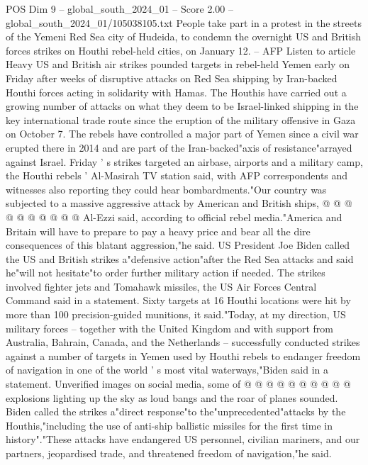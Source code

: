 \begin{textsample}{POS Dim 9 – global\_south\_2024\_01 – Score 2.00 – global\_south\_2024\_01/105038105.txt}  \label{ex:f9_pos_018}
People take part in a protest in the streets of the Yemeni Red Sea city of Hudeida, to condemn the overnight US and British forces strikes on Houthi rebel-held cities, on January 12. -- AFP Listen to article Heavy US and British air strikes pounded targets in rebel-held Yemen early on Friday after weeks of disruptive attacks on Red Sea shipping by Iran-backed Houthi forces acting in solidarity with Hamas.
The Houthis have carried out a growing number of attacks on what they deem to be Israel-linked shipping in the key international trade route since the eruption of the military offensive in Gaza on October 7.
The rebels have controlled a major part of Yemen since a civil war erupted there in 2014 and are part of the Iran-backed"axis of resistance"arrayed against Israel.
Friday ' s strikes targeted an airbase, airports and a military camp, the Houthi rebels ' Al-Masirah TV station said, with AFP correspondents and witnesses also reporting they could hear bombardments."Our country was subjected to a massive aggressive attack by American and British ships, @ @ @ @ @ @ @ @ @ @ Al-Ezzi said, according to official rebel media."America and Britain will have to prepare to pay a heavy price and bear all the dire consequences of this blatant aggression,"he said.
US President Joe Biden called the US and British strikes a"defensive action"after the Red Sea attacks and said he"will not hesitate"to order further military action if needed.
The strikes involved fighter jets and Tomahawk missiles, the US Air Forces Central Command said in a statement.
Sixty targets at 16 Houthi locations were hit by more than 100 precision-guided munitions, it said."Today, at my direction, US military forces -- together with the United Kingdom and with support from Australia, Bahrain, Canada, and the Netherlands -- successfully conducted strikes against a number of targets in Yemen used by Houthi rebels to endanger freedom of navigation in one of the world ' s most vital waterways,"Biden said in a statement.
Unverified images on social media, some of @ @ @ @ @ @ @ @ @ @ explosions lighting up the sky as loud bangs and the roar of planes sounded.
Biden called the strikes a"direct response"to the"unprecedented"attacks by the Houthis,"including the use of anti-ship ballistic missiles for the first time in history"."These attacks have endangered US personnel, civilian mariners, and our partners, jeopardised trade, and threatened freedom of navigation,"he said.

\end{textsample}
